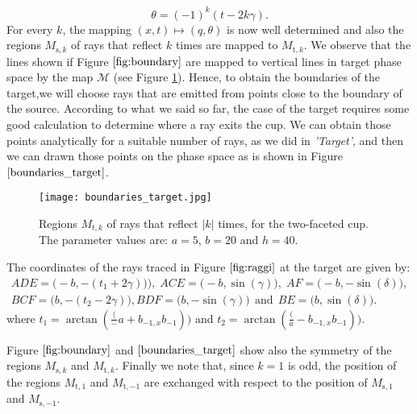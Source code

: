 \begin{equation}\label{teta}
\theta=(-1)^k(t-2k\gamma).
\end{equation}
For every $k$, the mapping $(x,t)\mapsto(q,\theta)$ is now well determined and also the regions $M_{\textrm{s},k}$ of rays that reflect $k$ times are mapped to $M_{\textrm{t},k}$.
We observe that the lines shown if Figure $\ref{fig:boundary}$ are mapped to vertical lines in target phase space by the map $\mathcal{M}$ (see Figure \ref{boundaries_target}).  Hence, to obtain the boundaries of the target,we will choose rays that are emitted from points close to the boundary of the source.
According to what we said so far, the case of the target requires some good calculation to determine where a ray exits the cup.
We can obtain those points analytically for a suitable number of rays, as we did in \textit{'Target'}, and then we can drawn those points on the phase space as is shown in
Figure $\ref{boundaries_target}$.

 \begin{figure}[htbp]
\texttt{[image: boundaries\_target.jpg]}
\caption{Regions $M_{t,k}$ of rays that reflect $|k|$ times, for the two-faceted cup. The parameter values are: $a=5$, $b=20$ and $h=40$.}
\label{boundaries_target}
\end{figure}
\noindent The coordinates of the rays traced in Figure $\ref{fig:raggi}$ at the target are given by:
$$ \begin{array}{cc}ADE = \big(-b, -(t_1+2\gamma)\big)),\; ACE = \big(-b, \sin(\gamma)\big),\; AF = \big(-b, -\sin(\delta)\big), \\
 BCF = \big(b, -(t_2-2\gamma)\big), BDF = \big(b, - \sin(\gamma)\big) \, \;\mbox{and} \,\; BE = \big(b, \sin(\delta)\big).\end{array} $$
 where $t_1 = \arctan(\frac(-a+b_{-1,x}{b_{-1}}))$ and $t_2 = \arctan(\frac(a-b_{-1,x}{b_{-1}}))$.


Figure $\ref{fig:boundary}$ and $\ref{boundaries_target}$ show also the symmetry of the regions $M_{\textrm{s},k}$ and $M_{\textrm{t},k}$. Finally we note that, since $k = 1$ is odd, the position of the regions $M_{\textrm{t},1}$ and $ M_{\textrm{t},-1}$ are exchanged with respect to the position of $ M_{\textrm{s},1}$ and $ M_{\textrm{s},-1}$.
